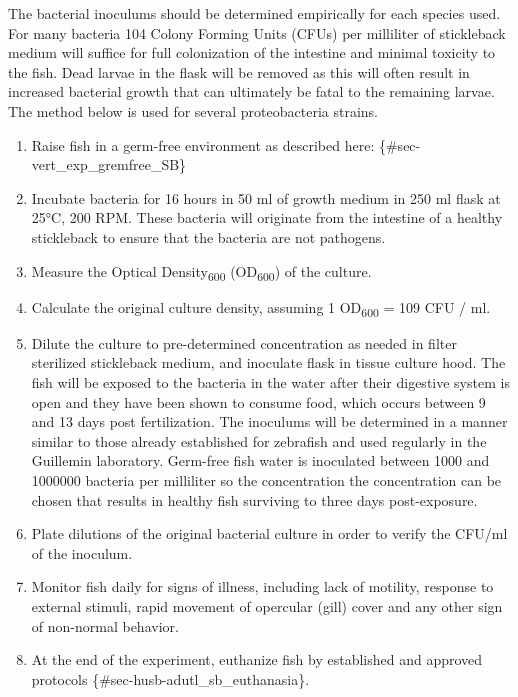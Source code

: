 \documentclass[
  letterpaper,
  DIV=11,
  numbers=noendperiod]{scrreprt}
\providecommand{\tightlist}{%
  \setlength{\itemsep}{0pt}\setlength{\parskip}{0pt}}\usepackage{longtable,booktabs,array}
\begin{document}
The bacterial inoculums should be determined empirically for each
species used. For many bacteria 104 Colony Forming Units (CFUs) per
milliliter of stickleback medium will suffice for full colonization of
the intestine and minimal toxicity to the fish. Dead larvae in the flask
will be removed as this will often result in increased bacterial growth
that can ultimately be fatal to the remaining larvae. The method below
is used for several proteobacteria strains.

\begin{enumerate}
\def\labelenumi{\arabic{enumi}.}
\tightlist
\item
  Raise fish in a germ-free environment as described here:
  \{\#sec-vert\_exp\_gremfree\_SB\}
\item
  Incubate bacteria for 16 hours in 50 ml of growth medium in 250 ml
  flask at 25°C, 200 RPM. These bacteria will originate from the
  intestine of a healthy stickleback to ensure that the bacteria are not
  pathogens.
\item
  Measure the Optical Density\textsubscript{600} (OD\textsubscript{600})
  of the culture.
\item
  Calculate the original culture density, assuming 1
  OD\textsubscript{600} = 109 CFU / ml.
\item
  Dilute the culture to pre-determined concentration as needed in filter
  sterilized stickleback medium, and inoculate flask in tissue culture
  hood. The fish will be exposed to the bacteria in the water after
  their digestive system is open and they have been shown to consume
  food, which occurs between 9 and 13 days post fertilization. The
  inoculums will be determined in a manner similar to those already
  established for zebrafish and used regularly in the Guillemin
  laboratory. Germ-free fish water is inoculated between 1000 and
  1000000 bacteria per milliliter so the concentration the concentration
  can be chosen that results in healthy fish surviving to three days
  post-exposure.
\item
  Plate dilutions of the original bacterial culture in order to verify
  the CFU/ml of the inoculum.
\item
  Monitor fish daily for signs of illness, including lack of motility,
  response to external stimuli, rapid movement of opercular (gill) cover
  and any other sign of non-normal behavior.
\item
  At the end of the experiment, euthanize fish by established and
  approved protocols \{\#sec-husb-adutl\_sb\_euthanasia\}.
\end{enumerate}
\end{document}
